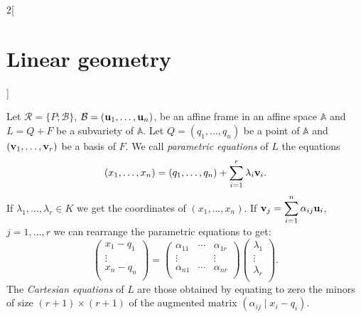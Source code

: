 \documentclass[../../../main.tex]{subfiles}
\begin{document}
\begin{multicols}{2}[\section{Linear geometry}]
\begin{definition}
  \end{definition}
  \begin{definition}
    Let $\mathcal{R}=\{P;\mathcal{B}\}$, $\mathcal{B}=(\boldsymbol{\mathrm{u}}_1,\ldots,\boldsymbol{\mathrm{u}}_n)$, be an affine frame in an affine space $\mathbb{A}$ and $L=Q+F$ be a subvariety of $\mathbb{A}$. Let $Q=(q_1,\ldots,q_n)$ be a point of $\mathbb{A}$ and $(\boldsymbol{\mathrm{v}}_1,\ldots,\boldsymbol{\mathrm{v}}_r)$ be a basis of $F$. We call \emph{parametric equations} of $L$ the equations $$(x_1,\ldots,x_n)=(q_1,\ldots,q_n)+\sum_{i=1}^r\lambda_i\boldsymbol{\mathrm{v}}_i.$$ If $\lambda_1,\ldots,\lambda_r\in K$ we get the coordinates of $(x_1,\ldots,x_n)$. If $\displaystyle \boldsymbol{\mathrm{v}}_j=\sum_{i=1}^n\alpha_{ij}\boldsymbol{\mathrm{u}}_i$, $j=1,\ldots,r$ we can rearrange the parametric equations to get: $$\begin{pmatrix}
        x_1-q_1 \\
        \vdots  \\
        x_n-q_n \\
      \end{pmatrix}=\begin{pmatrix}
        \alpha_{11} & \cdots & \alpha_{1r} \\
        \vdots      &        & \vdots      \\
        \alpha_{n1} & \cdots & \alpha_{nr} \\
      \end{pmatrix}\begin{pmatrix}
        \lambda_1 \\
        \vdots    \\
        \lambda_r \\
      \end{pmatrix}.$$ The \emph{Cartesian equations} of $L$ are those obtained by equating to zero the minors of size $(r+1)\times(r+1)$ of the augmented matrix $\left(\alpha_{ij}\mid x_i-q_i\right)$.
  \end{definition}

\end{multicols}
\end{document}
